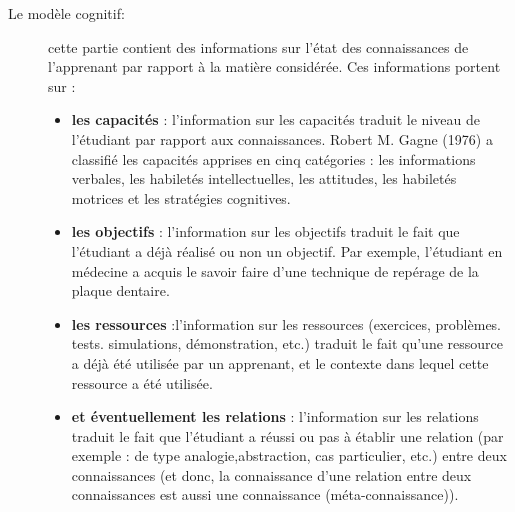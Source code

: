 \begin{description}
    \item[Le modèle cognitif:]  cette partie contient des informations sur l'état des connaissances de l'apprenant par rapport à la matière considérée. Ces informations portent sur :
    \begin{itemize}
        \item \textbf{les capacités} : l'information sur les capacités traduit le niveau de l'étudiant par rapport aux connaissances. Robert M. Gagne (1976) a classifié les capacités apprises en cinq catégories : les informations verbales, les habiletés intellectuelles, les attitudes, les habiletés motrices et les stratégies cognitives.
        \item \textbf{les objectifs}  : l'information sur les objectifs traduit le fait que l'étudiant a déjà réalisé ou non un objectif. Par exemple, l'étudiant en médecine a acquis le savoir faire d'une technique de repérage de la plaque dentaire.
        \item \textbf{les ressources} :l'information sur les ressources (exercices, problèmes. tests. simulations, démonstration, etc.) traduit le fait qu'une ressource a déjà été utilisée par un apprenant, et le contexte dans lequel cette ressource a été utilisée.
        \item \textbf{et éventuellement les relations} : l'information sur les relations traduit le fait que l'étudiant a réussi ou pas à établir une relation (par exemple : de type analogie,abstraction, cas particulier, etc.) entre deux connaissances (et donc, la connaissance
d'une relation entre deux connaissances est aussi une connaissance (méta-connaissance)). 
    \end{itemize}
\end{description}

